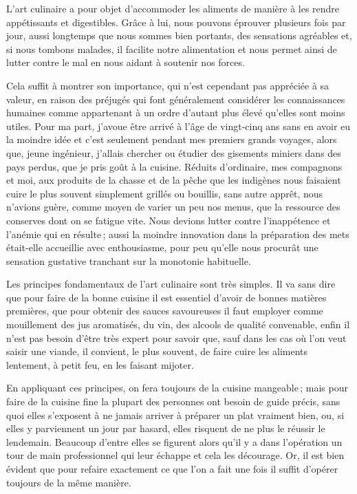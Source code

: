 \begin{itshape}
L'art culinaire a pour objet d'accommoder les aliments de manière à les rendre
appétissants et digestibles. Grâce à lui, nous pouvons éprouver plusieurs fois par
jour, aussi longtemps que nous sommes bien portants, des sensations agréables et,
si nous tombons malades, il facilite notre alimentation et nous permet ainsi de lutter
contre le mal en nous aidant à soutenir nos forces.

Cela suffit à montrer son importance, qui n'est cependant pas appréciée à sa
valeur, en raison des préjugés qui font généralement considérer les connaissances
humaines comme appartenant à un ordre d'autant plus élevé qu'elles sont moins
utiles. Pour ma part, j'avoue être arrivé à l'âge de vingt-cinq ans sans en avoir eu
la moindre idée et c'est seulement pendant mes premiers grands voyages, alors que,
jeune ingénieur, j'allais chercher ou étudier des gisements miniers dans des pays
perdus, que je pris goût à la cuisine. Réduits d'ordinaire, mes compagnons et moi,
aux produits de la chasse et de la pêche que les indigènes nous faisaient cuire le
plus souvent simplement grillés ou bouillis, sans autre apprêt, nous n'avions guère,
comme moyen de varier un peu nos menus, que la ressource des conserves dont on
se fatigue vite. Nous devions lutter contre l'inappétence et l'anémie qui en résulte ;
aussi la moindre innovation dans la préparation des mets était-elle accueillie avec
enthousiasme, pour peu qu'elle nous procurât une sensation gustative tranchant sur
la monotonie habituelle.

Les principes fondamentaux de l'art culinaire sont très simples. Il va sans dire
que pour faire de la bonne cuisine il est essentiel d'avoir de bonnes matières 
premières, que pour obtenir des sauces savoureuses il faut employer comme mouillement 
des jus aromatisés, du vin, des alcools de qualité convenable, enfin il n'est pas
besoin d'être très expert pour savoir que, sauf dans les cas où l'on veut saisir une
viande, il convient, le plus souvent, de faire cuire les aliments lentement, à petit
feu, en les faisant mijoter.

En appliquant ces principes, on fera toujours de la cuisine mangeable ; mais
pour faire de la cuisine fine la plupart des personnes ont besoin de guide
précis, sans quoi elles s'exposent à ne jamais arriver à préparer un plat
vraiment bien, ou, si elles y parviennent un jour par hasard, elles risquent de
ne plus le réussir le lendemain. Beaucoup d'entre elles se figurent alors qu'il
y a dans l'opération un tour de main professionnel qui leur échappe et cela les
décourage. Or, il est bien évident que pour refaire exactement ce que l'on
a fait une fois il suffit d'opérer toujours de la même manière.


\end{itshape}

